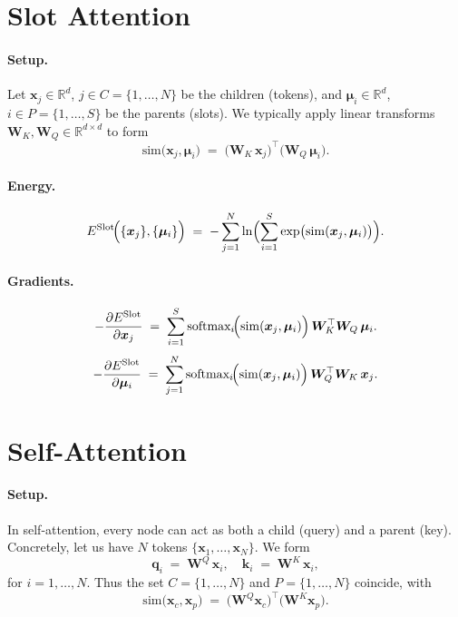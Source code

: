 \documentclass{article}
\begin{document}
\section{Slot Attention}

\paragraph{Setup.}
Let \(\bm{x}_j \in \mathbb{R}^d\), \(j\in C=\{1,\ldots,N\}\) be the children (tokens), and \(\bm{\mu}_i \in \mathbb{R}^d\), \(i \in P=\{1,\ldots,S\}\) be the parents (slots).  
We typically apply linear transforms \(\bm{W}_K,\bm{W}_Q \in \mathbb{R}^{d \times d}\) to form
\[
\mathrm{sim}\bigl(\bm{x}_j,\bm{\mu}_i\bigr)
\;=\;
\bigl(\bm{W}_K\,\bm{x}_j\bigr)^\top
\bigl(\bm{W}_Q\,\bm{\mu}_i\bigr).
\]

\paragraph{Energy.}
\begin{equation}
E^{\mathrm{Slot}}\!\Bigl(\{\bm{x}_j\}, \{\bm{\mu}_i\}\Bigr)
\;=\;
-\sum_{j=1}^N
\ln \Bigl(\sum_{i=1}^S
\exp \bigl(\mathrm{sim}(\bm{x}_j,\bm{\mu}_i)\bigr)\Bigr).
\end{equation}

\paragraph{Gradients.}
\begin{equation}
-\frac{\partial E^{\mathrm{Slot}}}{\partial \bm{x}_j}
\;=\;
\sum_{i=1}^S
\text{softmax}_{i}\!\Bigl(\mathrm{sim}(\bm{x}_j,\bm{\mu}_i)\Bigr)\,
\bm{W}_K^\top \bm{W}_Q\,\bm{\mu}_i.
\end{equation}
\begin{equation}
-\frac{\partial E^{\mathrm{Slot}}}{\partial \bm{\mu}_i}
\;=\;
\sum_{j=1}^N
\text{softmax}_{i}\!\Bigl(\mathrm{sim}(\bm{x}_j,\bm{\mu}_i)\Bigr)\,
\bm{W}_Q^\top \bm{W}_K\,\bm{x}_j.
\end{equation}

\section{Self-Attention}

\paragraph{Setup.}
In self-attention, every node can act as both a child (query) and a parent (key). Concretely, let us have \(N\) tokens \(\{\bm{x}_1,\dots,\bm{x}_N\}\).  We form
\[
\bm{q}_i \;=\; \bm{W}^Q\,\bm{x}_i,
\quad
\bm{k}_i \;=\; \bm{W}^K\,\bm{x}_i,
\]
for \(i = 1,\ldots,N\).  
Thus the set \(C = \{1,\ldots,N\}\) and \(P = \{1,\ldots,N\}\) coincide, with
\[
\mathrm{sim}\bigl(\bm{x}_c,\bm{x}_p\bigr)
\;=\;
\bigl(\bm{W}^Q \bm{x}_c\bigr)^\top
\bigl(\bm{W}^K \bm{x}_p\bigr).
\]
\end{document}
